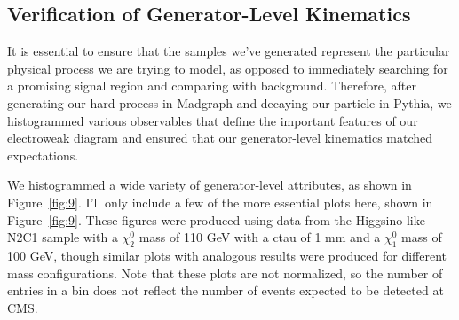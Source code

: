 \documentclass{article}
\begin{document}
\subsection{Verification of Generator-Level Kinematics}
It is essential to ensure that the samples we've generated represent the particular physical process we are trying to model, as opposed to immediately searching for a promising signal region and comparing with background. Therefore, after generating our hard process in Madgraph and decaying our particle in Pythia, we histogrammed various observables that define the important features of our electroweak diagram and ensured that our generator-level kinematics matched expectations.
\par
We histogrammed a wide variety of generator-level attributes, as shown in Figure~\ref{fig:9}. I'll only include a few of the more essential plots here, shown in Figure~\ref{fig:9}. These figures were produced using data from the Higgsino-like N2C1 sample with a $\chi_{2}^{0}$ mass of 110 GeV with a ctau of 1 mm and a $\chi_{1}^{0}$ mass of 100 GeV, though similar plots with analogous results were produced for different mass configurations. Note that these plots are not normalized, so the number of entries in a bin does not reflect the number of events expected to be detected at CMS.
\par
\end{document}
